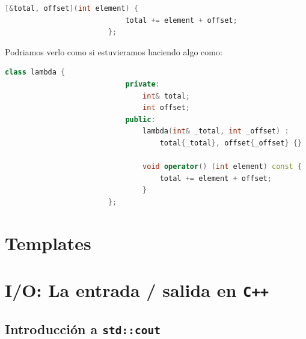 \documentclass[12pt, fleqn]{report}                             %
\theoremstyle{break}                                            %
\newcommand{\textCode}[1]  { \texttt{#1} }                      %
\newcommand{\Cpp}{\ignorespaces\textCode{C++}}                  %
\begin{document}
                    \begin{lstlisting}[language=C++, gobble=24]
                        [&total, offset](int element) { 
                            total += element + offset;
                        };
                    \end{lstlisting}

                    Podriamos verlo como si estuvieramos haciendo algo como:
                    \begin{lstlisting}[language=C++, gobble=24]
                        class lambda {
                            private:
                                int& total;
                                int offset;
                            public: 
                                lambda(int& _total, int _offset) : 
                                    total{_total}, offset{_offset} {}

                                void operator() (int element) const { 
                                    total += element + offset;
                                }
                        };
                    \end{lstlisting}

                    \cite{shaharmikeLambdas}


        \clearpage
        \section{Templates}



        \clearpage
        \section{I/O: La entrada / salida en \Cpp}

            \subsection{Introducción a \textCode{std::cout}}
                
\end{document}
